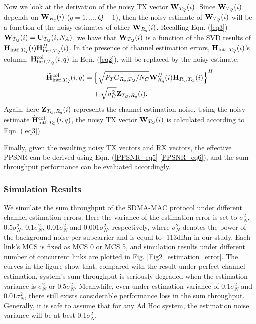 \documentclass[journal, final]{IEEEtran}
\begin{document}
Now we look at the derivation of the noisy TX vector ${\rm {\bf W}}_{T_Q }
(i)$. Since ${\rm {\bf W}}_{T_Q } (i)$ depends on ${\rm {\bf W}}_{R_q } (i)$
($q=1, \ldots, Q-1$), then the noisy estimate of ${\rm {\bf W}}_{T_Q } (i)$
will be a function of the noisy estimates of other ${\rm {\bf W}}_{R_q }
(i)$. Recalling Eqn. (\ref{eq3}) ${\rm {\bf W}}_{T_Q } (i) = {\rm {\bf U}}_{T_Q }
(i,N_A )$, we have that ${\rm {\bf W}}_{T_Q } (i)$ is a function of the
SVD results of ${\rm {\bf H}}_{{\rm intf},T_Q } (i){\rm
{\bf H}}_{{\rm intf},T_Q }^H (i)$. In the presence of channel estimation
errors, ${\rm {\bf H}}_{{\rm intf},T_Q } (i)$'s column, ${\rm {\bf
H}}_{{\rm intf},T_Q }^{{\rm col}} (i,q)$ in Eqn. (\ref{eq2}), will be replaced by
the noisy estimate:
\begin{align}
\label{eq15}
\widetilde{{\rm {\bf H}}}_{{\rm intf},T_Q }^{{\rm col}} (i,q) =& \left\{
{\sqrt {P_T G_{R_q ,T_Q } / N_C } {\rm {\bf W}}_{R_q }^H (i){\rm {\bf
H}}_{R_q ,T_Q } (i)} \right\}^H \nonumber\\
&+ \sqrt {\sigma _C^2 } {\rm {\bf Z}}_{T_Q,R_q } (i).
\end{align}
Again, here ${\rm {\bf Z}}_{T_Q ,R_q } (i)$ represents the channel
estimation noise. Using the noisy estimate $\widetilde{{\rm {\bf
H}}}_{{\rm intf},T_Q }^{{\rm col}} (i,q)$, the noisy TX vector ${\rm {\bf
W}}_{T_Q } (i)$ is calculated according to Eqn. (\ref{eq3}).

Finally, given the resulting noisy TX vectors and RX vectors, the effective
PPSNR can be derived using Eqn. (\ref{PPSNR_eq5}-\ref{PPSNR_eq6}), and the sum-throughput performance
can be evaluated accordingly.

\subsubsection{Simulation Results}

We simulate the sum throughput of the SDMA-MAC protocol under different
channel estimation errors. Here the variance of the estimation error is set
to $\sigma _N^2 $, $0.5\sigma _N^2 $, $0.1\sigma _N^2 $, $0.01\sigma _N^2 $
and $0.001\sigma _N^2 $, respectively, where $\sigma _N^2 $ denotes the
power of the background noise per subcarrier and is equal to -113dBm in our study. Each
link's MCS is fixed as MCS 0 or MCS 5, and simulation results under
different number of concurrent links are plotted in Fig. \ref{Fig2_estimation_error}. The curves in
the figure show that, compared with the result under perfect channel
estimation, system's sum throughput is seriously degraded when the
estimation variance is $\sigma _N^2 $ or $0.5\sigma _N^2 $. Meanwhile, even
under estimation variance of $0.1\sigma _N^2 $ and $0.01\sigma _N^2 $, there
still exists considerable performance loss in the sum throughput. Generally, it is safe to
assume that for any Ad Hoc system, the estimation noise variance will be at
best 0.1$\sigma_{N}^{2}$.
\end{document}
